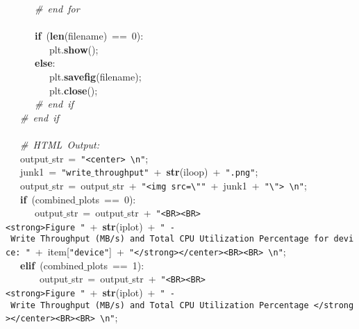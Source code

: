 \mbox{}\ \ \ \ \ \ \textit{\#\ end\ for} \\
\mbox{}\ \ \ \ \ \  \\
\mbox{}\ \ \ \ \ \ \textbf{if}\ (\textbf{len}(filename)\ ==\ 0): \\
\mbox{}\ \ \ \ \ \ \ \ \ plt.\textbf{show}(); \\
\mbox{}\ \ \ \ \ \ \textbf{else}: \\
\mbox{}\ \ \ \ \ \ \ \ \ plt.\textbf{savefig}(filename); \\
\mbox{}\ \ \ \ \ \ \ \ \ plt.\textbf{close}(); \\
\mbox{}\ \ \ \ \ \ \textit{\#\ end\ if} \\
\mbox{}\ \ \ \textit{\#\ end\ if} \\
\mbox{}\ \ \  \\
\mbox{}\ \ \ \textit{\#\ HTML\ Output:} \\
\mbox{}\ \ \ output$\_$str\ =\ \texttt{"{}\textless{}center\textgreater{}\ \textbackslash{}n"{}}; \\
\mbox{}\ \ \ junk1\ =\ \texttt{"{}write$\_$throughput"{}}\ +\ \textbf{str}(iloop)\ +\ \texttt{"{}.png"{}}; \\
\mbox{}\ \ \ output$\_$str\ =\ output$\_$str\ +\ \texttt{"{}\textless{}img\ src=\textbackslash{}"{}"{}}\ +\ junk1\ +\ \texttt{"{}\textbackslash{}"{}\textgreater{}\ \textbackslash{}n"{}}; \\
\mbox{}\ \ \ \textbf{if}\ (combined$\_$plots\ ==\ 0): \\
\mbox{}\ \ \ \ \ \ output$\_$str\ =\ output$\_$str\ +\ \texttt{"{}\textless{}BR\textgreater{}\textless{}BR\textgreater{}\textless{}strong\textgreater{}Figure\ "{}}\ +\ \textbf{str}(iplot)\ +\ \texttt{"{}\ -\ Write\ Throughput\ (MB/s)\ and\ Total\ CPU\ Utilization\ Percentage\ for\ device:\ "{}}\ +\ item[\texttt{"{}device"{}}]\ +\ \texttt{"{}\textless{}/strong\textgreater{}\textless{}/center\textgreater{}\textless{}BR\textgreater{}\textless{}BR\textgreater{}\ \textbackslash{}n"{}}; \\
\mbox{}\ \ \ \textbf{elif}\ (combined$\_$plots\ ==\ 1): \\
\mbox{}\ \ \ \ \ \ \ output$\_$str\ =\ output$\_$str\ +\ \texttt{"{}\textless{}BR\textgreater{}\textless{}BR\textgreater{}\textless{}strong\textgreater{}Figure\ "{}}\ +\ \textbf{str}(iplot)\ +\ \texttt{"{}\ -\ Write\ Throughput\ (MB/s)\ and\ Total\ CPU\ Utilization\ Percentage\ \textless{}/strong\textgreater{}\textless{}/center\textgreater{}\textless{}BR\textgreater{}\textless{}BR\textgreater{}\ \textbackslash{}n"{}}; \\
